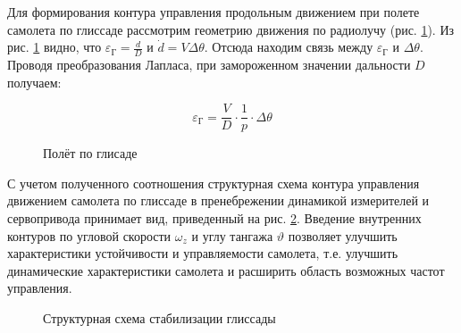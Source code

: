 Для формирования контура управления продольным движением при полете самолета по глиссаде рассмотрим геометрию движения по радиолучу (рис. \ref{fig:Полёт по глисаде 2}). Из рис. \ref{fig:Полёт по глисаде 2} видно, что $\varepsilon_\text{Г} = \frac{d}{D} $ и $\dot{d} = V\Delta \theta$. Отсюда находим связь между $\varepsilon_\text{Г}$ и $\Delta \theta$. Проводя преобразования Лапласа, при замороженном значении дальности $D$ получаем:

$$ \varepsilon_\text{Г} = \frac{V}{D} \cdot \frac{1}{p} \cdot \Delta \theta  $$

\begin{figure}[H]
    \caption{Полёт по глисаде}
    \label{fig:Полёт по глисаде 2}
\end{figure}

С учетом полученного соотношения структурная схема контура управления движением самолета по глиссаде в пренебрежении динамикой измерителей и сервопривода принимает вид, приведенный на рис. \ref{fig:Cистема автоматической посадки по глиссаде 2}. Введение внутренних контуров по угловой скорости $\omega_z$ и углу тангажа $\vartheta$  позволяет улучшить характеристики устойчивости и управляемости самолета, т.е. улучшить динамические характеристики самолета и расширить область возможных частот управления.

\begin{figure}[H]
    \caption{Структурная схема стабилизации глиссады}
    \label{fig:Cистема автоматической посадки по глиссаде 2}
\end{figure}

